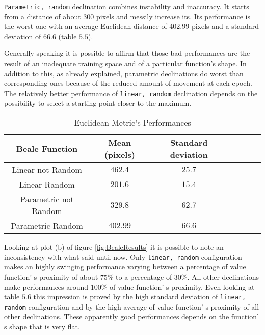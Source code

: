 {\tt Parametric, random} declination combines instability and inaccuracy. It starts from a distance of about $300$ pixels and messily increase its. Its performance is the worst one with an average Euclidean distance of $402.99$ pixels and a standard deviation of $66.6$ (table $5.5$).

Generally speaking it is possible to affirm that those bad performances are the result of an inadequate training space and of a particular function's shape. In addition to this, as already explained, parametric declinations do worst than corresponding ones because of the reduced amount of movement at each epoch. The relatively better performance of {\tt linear, random} declination depends on the possibility to select a starting point closer to the maximum. \\

\begin{table}[h!]
\centering
\resizebox{\linewidth}{!} {
	\begin{tabular}{c| cccccc} 
		\hline \textbf{Beale Function}
		& \textbf{Mean (pixels)} & \textbf{Standard deviation} \\ 
		\hline Linear not Random
		& $462.4$ & $25.7$\\ 
		\hline Linear Random
		& \cellcolor{red!25}$201.6$ & \cellcolor{red!25}$15.4$\\ 
		\hline Parametric not Random
		& $329.8$ & $62.7$\\ 
		\hline Parametric Random
		& $402.99$ & $66.6$ \\ 
		\hline 
	\end{tabular} 
}
\label{BealeTabEuclidean}
\caption{Euclidean Metric's Performances}
\end{table}

Looking at plot (b) of figure \ref{fig:BealeResults} it is possible to note an inconsistency with what said until now. Only {\tt linear, random} configuration makes an highly swinging performance varying between a percentage of value function' s proximity of about $75\%$ to a percentage of $30\%$. All other declinations make performances around $100\%$ of value function' s proximity. Even looking at table $5.6$ this impression is proved by the high standard deviation of {\tt linear, random} configuration and by the high average of value function' s proximity of all other declinations. These apparently good performances depends on the function' s shape that is very flat. 


